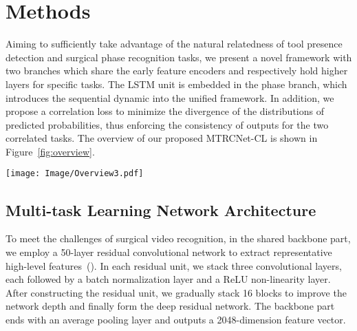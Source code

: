 \documentclass{elsarticle}
\begin{document}
\section{Methods}
Aiming to sufficiently take advantage of the natural relatedness of tool presence detection and surgical phase recognition tasks, 
we present a novel framework with two branches which share the early feature encoders and respectively hold higher layers for specific tasks.
The LSTM unit is embedded in the phase branch, which introduces the sequential dynamic into the unified framework.
In addition, we propose a correlation loss to minimize the divergence of the distributions of predicted probabilities,
thus enforcing the consistency of outputs for the two correlated tasks.
The overview of our proposed MTRCNet-CL is shown in Figure~\ref{fig:overview}.

\begin{figure*}[t]
	\centering
	\texttt{[image: Image/Overview3.pdf]}
	\caption{An overview of the proposed MTRCNet-CL for joint tool presence detection and phase recognition from surgical videos in a unified end-to-end framework. LSTM networks are illustrated by diagrams to indicate how temporal information is modeled.}
	\label{fig:overview}
\end{figure*}

\subsection{Multi-task Learning Network Architecture}
To meet the challenges of surgical video recognition, in the shared backbone part, we employ a 50-layer residual convolutional network to extract representative high-level features~(\cite{he2016deep}).
In each residual unit, we stack three convolutional layers, each followed by a batch normalization layer and a ReLU non-linearity layer.
After constructing the residual unit, we gradually stack 16 blocks to improve the network depth and finally form the deep residual network.
The backbone part ends with an average pooling layer and outputs a 2048-dimension feature vector.
\end{document}
